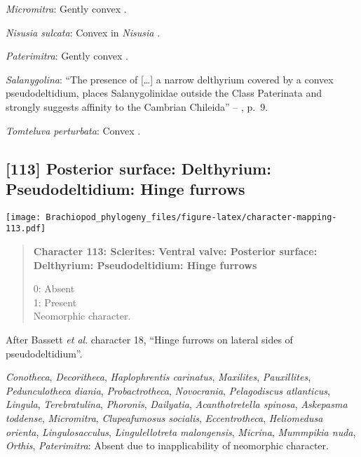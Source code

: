 \documentclass[openany]{book}
\theoremstyle{definition}
\theoremstyle{definition}
\theoremstyle{definition}
\theoremstyle{remark}
\begin{document}
\hypertarget{Micromitra-coding-112}{}
\emph{Micromitra}: Gently convex \citep[see][fig.
83.3]{Williams2000LinguliformeaCraniiformea}.

\hypertarget{Nisusia_sulcata-coding-112}{}
\emph{Nisusia sulcata}: Convex in \emph{Nisusia} \citep[see][fig.
8.4]{Rowell1985Theevolutionary}.

\hypertarget{Paterimitra-coding-112}{}
\emph{Paterimitra}: Gently convex \citep[see][fig.
83.1]{Williams2000LinguliformeaCraniiformea}.

\hypertarget{Salanygolina-coding-112}{}
\emph{Salanygolina}: ``The presence of {[}\ldots{}{]} a narrow
delthyrium covered by a convex pseudodeltidium, places Salanygolinidae
outside the Class Paterinata and strongly suggests affinity to the
Cambrian Chileida'' -- \citet{Holmer2009Theenigmatic}, p.~9.

\hypertarget{Tomteluva_perturbata-coding-112}{}
\emph{Tomteluva perturbata}: Convex \citep{Streng2016Anew}.

\subsection*{{[}113{]} Posterior surface: Delthyrium: Pseudodeltidium:
Hinge
furrows}\label{posterior-surface-delthyrium-pseudodeltidium-hinge-furrows}

\texttt{[image: Brachiopod\_phylogeny\_files/figure-latex/character-mapping-113.pdf]}

\begin{quote}
\textbf{Character 113: Sclerites: Ventral valve: Posterior surface:
Delthyrium: Pseudodeltidium: Hinge furrows}

0: Absent\\
1: Present\\
Neomorphic character.
\end{quote}

After Bassett \emph{et al}.
\citeyearpar{Bassett2001Functionalmorphology} character 18, ``Hinge
furrows on lateral sides of pseudodeltidium''.

\hypertarget{Acanthotretella_spinosa-coding-113}{}
\emph{Conotheca}, \emph{Decoritheca}, \emph{Haplophrentis carinatus},
\emph{Maxilites}, \emph{Pauxillites}, \emph{Pedunculotheca diania},
\emph{Probactrotheca}, \emph{Novocrania}, \emph{Pelagodiscus
atlanticus}, \emph{Lingula}, \emph{Terebratulina}, \emph{Phoronis},
\emph{Dailyatia}, \emph{Acanthotretella spinosa}, \emph{Askepasma
toddense}, \emph{Micromitra}, \emph{Clupeafumosus socialis},
\emph{Eccentrotheca}, \emph{Heliomedusa orienta},
\emph{Lingulosacculus}, \emph{Lingulellotreta malongensis},
\emph{Micrina}, \emph{Mummpikia nuda}, \emph{Orthis},
\emph{Paterimitra}: Absent due to inapplicability of neomorphic
character.
\end{document}
